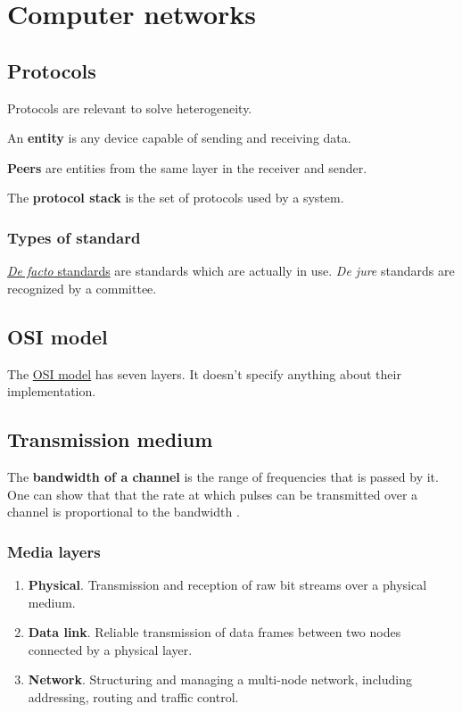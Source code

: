 \chapter{Computer networks}

\section{Protocols}

Protocols are relevant to solve heterogeneity.

An \textbf{entity} is any device capable of sending and receiving data.

\textbf{Peers} are entities from the same layer in the receiver and sender.

The \textbf{protocol stack} is the set of protocols used by a system.

\subsection{Types of standard}

\href{https://en.wikipedia.org/wiki/De_facto_standard}{\emph{De facto} standards} are standards which are actually in use.
\emph{De jure} standards are recognized by a committee.

\section{OSI model}

The \href{https://en.wikipedia.org/wiki/OSI_model}{OSI model} has seven layers. It doesn't specify anything about their implementation.

\section{Transmission medium}

The \textbf{bandwidth of a channel} is the range of frequencies that is passed by it.
One can show that that the rate at which pulses can be transmitted over a channel is proportional to the bandwidth \cite{communication-networks-leon-garcia-2000}.

\subsection{Media layers}

\begin{enumerate}
\item \textbf{Physical}. Transmission and reception of raw bit streams over a physical medium.
\item \textbf{Data link}. Reliable transmission of data frames between two nodes connected by a physical layer.
\item \textbf{Network}. Structuring and managing a multi-node network, including addressing, routing and traffic control.
\end{enumerate}

